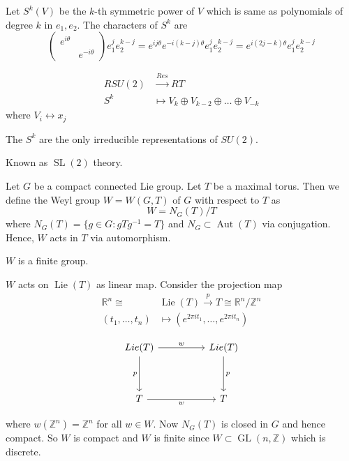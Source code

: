 \documentclass[11pt,a4paper]{scrarticle}
\theoremstyle{definition}
\renewenvironment{proof}[1][\proofname]{\vspace{-10pt}\begin{myproof}}{\end{myproof}}
\theoremstyle{greenbox}
\newcommand{\R}{\mathbb{R}}
\newcommand{\Z}{\mathbb{Z}}
\begin{document}
Let $ S^{k}(V  ) $ be the $ k $-th symmetric power of $ V $ which is same as polynomials of degree $ k $ in $ e_{1},e_{2} $. The characters of $ S^{k} $ are 
\[ \begin{pmatrix}
    e^{i \theta} & \\
    & e^{-i \theta}\end{pmatrix}e_{1}^{j}e_{2}^{k-j} = e^{ij \theta}e^{-i(k-j) \theta}e_{1}^{j} e_{2}^{k-j} = e^{i(2j-k) \theta}e_{1}^{j}e_{2}^{k-j}
 \]

\begin{align*}
    RSU(2) & \xrightarrow{Res_{}^{}} RT \\
    S^{k} & \mapsto V_{k} \oplus V_{k-2} \oplus \dots \oplus V_{-k}
\end{align*}
where $ V_{i} \leftrightarrow x_{j} $

\begin{thm}
    The $ S^{k} $ are the only irreducible representations of $ SU(2) $. 
\end{thm}
Known as $ \operatorname{SL}(2) $ theory. 

Let $ G $ be a compact connected Lie group. Let $ T $ be a maximal torus. Then we define the Weyl group $ W = W(G,T) $ of $ G  $ with respect to $ T $ as 
\[ W = N_{G}(T) / T \]
where $ N_{G}(T) = \{g \in G : gTg^{-1} = T\} $
 and $ N_{G} \subset \operatorname{Aut}(T) $ via conjugation. Hence, $ W  $ acts in $ T $ via automorphism. \begin{thm}
    $ W $ is a finite group.
 \end{thm}
 \begin{proof}
    $ W $ acts on $ \operatorname{Lie}(T) $ as linear map. Consider the projection map 
   \begin{align*}
    \R^{n} \cong & \operatorname{Lie}(T) \xrightarrow{p} T \cong \R^{n} / \Z^{n} \\
    (t_{1}, \dots, t_{n}) & \mapsto (e^{2 \pi i t_{1}}, \dots, e^{2 \pi i t_{n}})
   \end{align*}

\[\begin{tikzcd}
	{Lie(T)} && {Lie(T)} \\
	\\
	T && T
	\arrow["w", from=1-1, to=1-3]
	\arrow["p"', from=1-1, to=3-1]
	\arrow["w"', from=3-1, to=3-3]
	\arrow["p", from=1-3, to=3-3]
\end{tikzcd}\]
    
where $ w(\Z^{n}) = \Z^{n}  $ for all $ w \in W $. Now $ N_{G}(T)    $ is closed in $ G $ and hence compact. So $ W  $ is compact and $ W $ is finite since $ W \subset \operatorname{GL}(n,\Z)$ which is discrete.  
 \end{proof}
\end{document}
